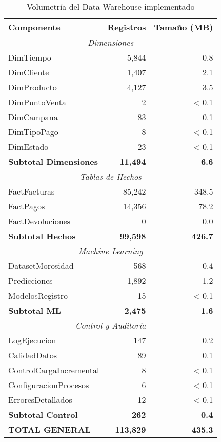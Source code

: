 \begin{table}[ht]
\centering
\begin{tabular}{|l|r|r|}
\hline
\textbf{Componente} & \textbf{Registros} & \textbf{Tamaño (MB)} \\
\hline
\multicolumn{3}{|c|}{\textit{Dimensiones}} \\
\hline
DimTiempo & 5,844 & 0.8 \\
DimCliente & 1,407 & 2.1 \\
DimProducto & 4,127 & 3.5 \\
DimPuntoVenta & 2 & < 0.1 \\
DimCampana & 83 & 0.1 \\
DimTipoPago & 8 & < 0.1 \\
DimEstado & 23 & < 0.1 \\
\hline
\textbf{Subtotal Dimensiones} & \textbf{11,494} & \textbf{6.6} \\
\hline
\multicolumn{3}{|c|}{\textit{Tablas de Hechos}} \\
\hline
FactFacturas & 85,242 & 348.5 \\
FactPagos & 14,356 & 78.2 \\
FactDevoluciones & 0 & 0.0 \\
\hline
\textbf{Subtotal Hechos} & \textbf{99,598} & \textbf{426.7} \\
\hline
\multicolumn{3}{|c|}{\textit{Machine Learning}} \\
\hline
DatasetMorosidad & 568 & 0.4 \\
Predicciones & 1,892 & 1.2 \\
ModelosRegistro & 15 & < 0.1 \\
\hline
\textbf{Subtotal ML} & \textbf{2,475} & \textbf{1.6} \\
\hline
\multicolumn{3}{|c|}{\textit{Control y Auditoría}} \\
\hline
LogEjecucion & 147 & 0.2 \\
CalidadDatos & 89 & 0.1 \\
ControlCargaIncremental & 8 & < 0.1 \\
ConfiguracionProcesos & 6 & < 0.1 \\
ErroresDetallados & 12 & < 0.1 \\
\hline
\textbf{Subtotal Control} & \textbf{262} & \textbf{0.4} \\
\hline
\hline
\textbf{TOTAL GENERAL} & \textbf{113,829} & \textbf{435.3} \\
\hline
\end{tabular}
\caption{Volumetría del Data Warehouse implementado}
\label{tab:volumetria_dw}
\end{table}

